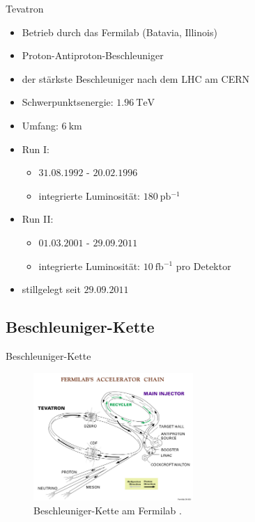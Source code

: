 \documentclass[aspectratio=1610, 9pt]{beamer}
\begin{document}
\begin{frame}{Tevatron}
    \begin{itemize}
      \item Betrieb durch das Fermilab (Batavia, Illinois)
      \item Proton-Antiproton-Beschleuniger
      \item der stärkste Beschleuniger nach dem LHC am CERN
      \item Schwerpunktsenergie: $\SI{1,96}{\TeV}$
      \item Umfang: $\SI{6}{\km}$
      \item Run I:
      \begin{itemize}
        \item $31.08.1992$ - $20.02.1996$
        \item integrierte Luminosität: $\SI{180}{\pico \barn^{-1}}$
      \end{itemize}
      \item Run II:
      \begin{itemize}
        \item $01.03.2001$ - $29.09.2011$
        \item integrierte Luminosität: $\SI{10}{\femto \barn^{-1}}$ pro Detektor
      \end{itemize}
      \item stillgelegt seit $29.09.2011$
    \end{itemize}
\end{frame}

\subsection{Beschleuniger-Kette}

\begin{frame}{Beschleuniger-Kette}
  \begin{figure}
    \includegraphics[width=0.54\textwidth]{images/accelerator_chain.jpg}
    \caption{Beschleuniger-Kette am Fermilab \cite{accelerator_chain}.}
  \end{figure}
\end{frame}
\end{document}
